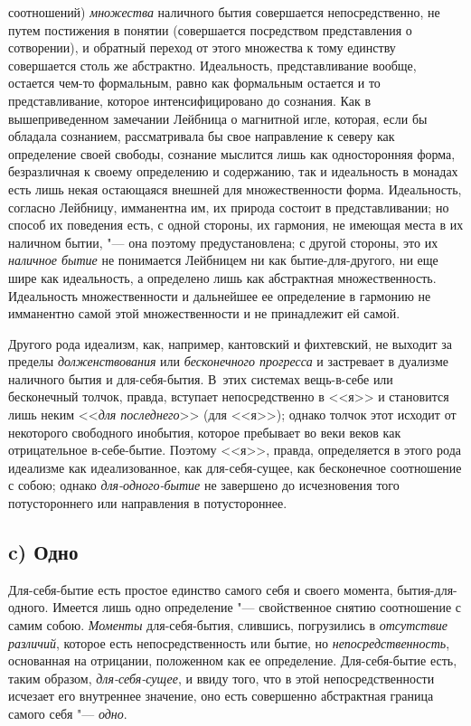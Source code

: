 соотношений) {\em множества} наличного бытия
совершается непосредственно, не путем постижения в понятии (совершается
посредством представления о сотворении), и обратный переход от этого
множества к тому единству совершается столь же абстрактно. Идеальность,
представливание вообще, остается чем-то формальным, равно как формальным
остается и то представливание, которое интенсифицировано до сознания. Как в
вышеприведенном замечании Лейбница о магнитной игле, которая, если
бы обладала сознанием, рассматривала бы свое направление к северу как
определение своей свободы, сознание мыслится лишь как односторонняя форма,
безразличная к своему определению и содержанию, так и идеальность в монадах
есть лишь некая остающаяся внешней для множественности форма. Идеальность,
согласно Лейбницу, имманентна им, их природа состоит в представливании; но
способ их поведения есть, с одной стороны, их гармония, не имеющая места в
их наличном бытии, "--- она поэтому предустановлена; с другой стороны, это их
{\em наличное бытие} не понимается Лейбницем ни как
бытие-для-другого, ни еще шире как идеальность, а определено лишь как
абстрактная множественность. Идеальность множественности и дальнейшее ее
определение в гармонию не имманентно самой этой множественности и не
принадлежит ей самой.

Другого рода идеализм, как, например, кантовский и фихтевский, не выходит за
пределы {\em долженствования} или
{\em бесконечного прогресса} и застревает в дуализме
наличного бытия и для-себя-бытия. В~этих системах вещь-в-себе или
бесконечный толчок, правда, вступает непосредственно в <<я>> и становится
лишь неким <<{\em для последнего}>> (для <<я>>); однако
толчок этот исходит от некоторого свободного инобытия, которое пребывает во
веки веков как отрицательное в-себе-бытие. Поэтому <<я>>, правда,
определяется в этого рода идеализме как идеализованное, как для-себя-сущее,
как бесконечное соотношение с собою; однако
{\em для-одного-бытие} не завершено до исчезновения
того потустороннего или направления в потустороннее.

\subsection[c) Одно]{c) Одно}
Для-себя-бытие есть простое единство самого себя и своего момента,
бытия-для-одного. Имеется лишь одно определение "--- свойственное снятию
соотношение с самим собою. {\em Моменты}
для-себя-бытия, слившись, погрузились в {\em отсутствие
различий}, которое есть непосредственность или бытие, но
{\em непосредственность}, основанная на отрицании,
положенном как ее определение. Для-себя-бытие есть, таким образом,
{\em для-себя-сущее}, и ввиду того, что в этой
непосредственности исчезает его внутреннее значение, оно есть совершенно
абстрактная граница самого себя "--- {\em одно}.

